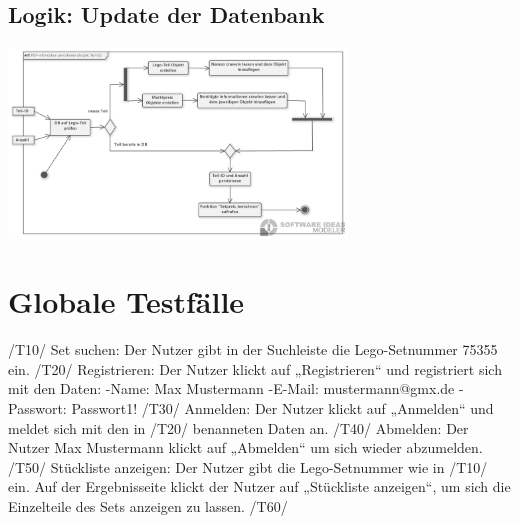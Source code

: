 \subsection{Logik: Update der Datenbank}
\includegraphics[width=9cm]{pictures/9.EinspielenNeuerTeile.png} \newpage 

\section{Globale Testfälle}
/T10/ \newline 
Set suchen: Der Nutzer gibt in der Suchleiste die Lego-Setnummer 75355 ein. \newline 
\newline 
/T20/ \newline 
Registrieren: Der Nutzer klickt auf „Registrieren“ und registriert sich mit den Daten: \newline 
-Name: Max Mustermann \newline 
-E-Mail: mustermann@gmx.de \newline 
-Passwort: Passwort1! \newline 
\newline 
/T30/ \newline 
Anmelden: Der Nutzer klickt auf „Anmelden“ und meldet sich mit den in /T20/ benanneten Daten an. \newline 
\newline 
/T40/ \newline 
Abmelden: Der Nutzer Max Mustermann klickt auf „Abmelden“ um sich wieder abzumelden. \newline 
\newline 
/T50/ \newline 
Stückliste anzeigen: Der Nutzer gibt die Lego-Setnummer wie in /T10/ ein. Auf der Ergebnisseite klickt der Nutzer auf „Stückliste anzeigen“, um sich die Einzelteile des Sets anzeigen zu lassen. \newline 
\newline 
/T60/ \newline 

